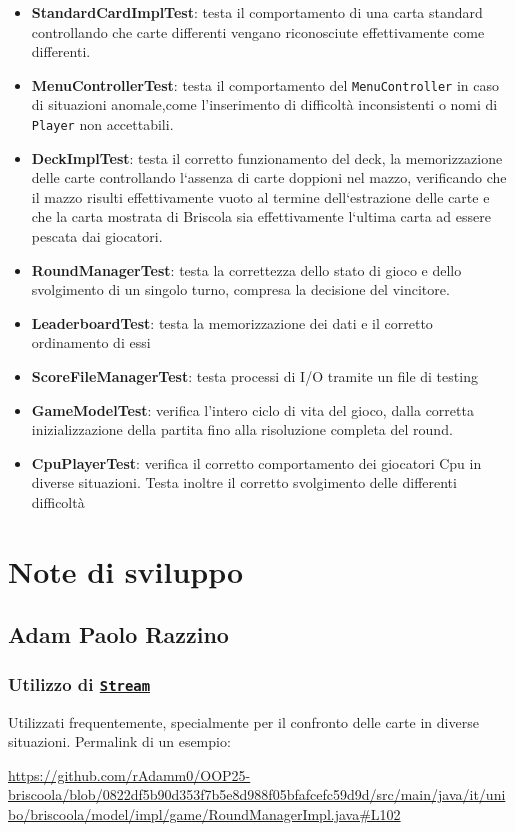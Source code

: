 \documentclass[a4paper,12pt]{report}
\begin{document}
%
\begin{itemize}
    \item \textbf{StandardCardImplTest}: testa il comportamento di una carta standard controllando che carte differenti vengano riconosciute effettivamente come differenti.
    \item \textbf{MenuControllerTest}: testa il comportamento del \texttt{MenuController} in caso di situazioni anomale,come l'inserimento di difficoltà inconsistenti o nomi di \texttt{Player} non accettabili.
    \item \textbf{DeckImplTest}: testa il corretto funzionamento del deck, la memorizzazione delle carte controllando l`assenza di carte doppioni nel mazzo, verificando che il mazzo risulti effettivamente vuoto al termine dell`estrazione delle carte e che la carta mostrata di Briscola sia effettivamente l`ultima carta ad essere pescata dai giocatori.
    \item \textbf{RoundManagerTest}: testa la correttezza dello stato di gioco e dello svolgimento di un singolo turno, compresa la decisione del vincitore.
    \item \textbf{LeaderboardTest}: testa la memorizzazione dei dati e il corretto ordinamento di essi
    \item \textbf{ScoreFileManagerTest}: testa processi di I/O tramite un file di testing
    \item \textbf{GameModelTest}: verifica l'intero ciclo di vita del gioco, dalla corretta inizializzazione della partita fino alla risoluzione completa del round.
    \item \textbf{CpuPlayerTest}: verifica il corretto comportamento dei giocatori Cpu in diverse situazioni. Testa inoltre il corretto svolgimento delle differenti difficoltà
\end{itemize}
%

\section{Note di sviluppo}

\subsection{Adam Paolo Razzino}
\subsubsection{\textbf{Utilizzo di \href{https://docs.oracle.com/javase/8/docs/api/java/util/stream/Stream.html}{\texttt{Stream}}}}
Utilizzati frequentemente, specialmente per il confronto delle carte in diverse situazioni. Permalink di un esempio:
\begin{sloppypar}
    \raggedright
    \url{https://github.com/rAdamm0/OOP25-briscoola/blob/0822df5b90d353f7b5e8d988f05bfafcefc59d9d/src/main/java/it/unibo/briscoola/model/impl/game/RoundManagerImpl.java#L102}
\end{sloppypar}
\end{document}
